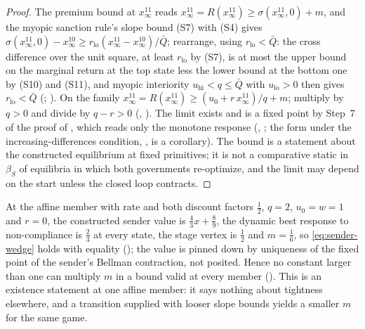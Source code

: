 \begin{proof}
The premium bound at $x^{11}_\infty$ reads $x^{11}_\infty=R(x^{11}_\infty)\ge\sigma(x^{11}_\infty,0)+m$, and the myopic sanction rule's
slope bound (S7) with (S4) gives $\sigma(x^{11}_\infty,0)-x^{10}_\infty\ge r_{\mathrm{lo}}(x^{11}_\infty-x^{10}_\infty)/\bar Q$;
rearrange, using $r_{\mathrm{lo}}<\bar Q$: the cross difference over the unit
square, at least $r_{\mathrm{lo}}$ by (S7), is at most the upper bound on the marginal return at the top
state less the lower bound at the bottom one by (S10) and (S11), and myopic
interiority $u_{\mathrm{hi}}<q\le\bar Q$ with $u_{\mathrm{lo}}>0$ then gives
$r_{\mathrm{lo}}<\bar Q$ (; ).
On the family $x^{11}_\infty=R(x^{11}_\infty)\ge(u_0+r\,x^{11}_\infty)/q+m$; multiply by $q>0$ and divide by $q-r>0$
(, ). The limit exists
and is a fixed point by Step~7 of the proof of ,
which reads only the monotone response
(,
; the form under the
increasing-differences condition, , is a corollary). The bound is a statement about
the constructed equilibrium at fixed primitives; it is not a comparative
static in $\beta_S$ of equilibria in which both governments re-optimize, and the limit may depend on the
start unless the closed loop contracts.
\end{proof}

\begin{remark}
\label{rem:wedge-sharp}
At the affine member with rate and both discount factors $\tfrac12$, $q=2$,
$u_0=w=1$ and $r=0$, the constructed sender value is $\tfrac43x+\tfrac89$, the
dynamic best response to non-compliance is $\tfrac23$ at every state, the stage
vertex is $\tfrac12$ and $m=\tfrac16$, so \eqref{eq:sender-wedge} holds with
equality (); the value is pinned down by
uniqueness of the fixed point of the sender's Bellman contraction, not posited.
Hence no constant larger than one can multiply $m$ in a bound valid at every
member (). This is an existence
statement at one affine member: it says nothing about tightness elsewhere, and
a transition supplied with looser slope bounds yields a smaller $m$ for
the same game.
\end{remark}

